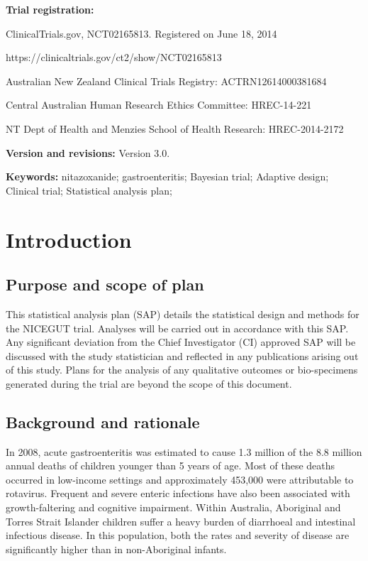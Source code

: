 \documentclass[a4paper]{article}
\begin{document}
\clearpage

{\bf Trial registration:} 

\setlength{\leftskip}{1cm}ClinicalTrials.gov, NCT02165813. Registered on June 18, 2014

\setlength{\leftskip}{1cm}https://clinicaltrials.gov/ct2/show/NCT02165813

\setlength{\leftskip}{1cm}Australian New Zealand Clinical Trials Registry: ACTRN12614000381684

\setlength{\leftskip}{1cm}Central Australian Human Research
Ethics Committee: HREC-14-221

\setlength{\leftskip}{1cm}NT Dept of Health and Menzies School of Health
Research: HREC-2014-2172

\setlength{\leftskip}{0pt}
{\bf Version and revisions:} Version 3.0.

{\bf Keywords:} nitazoxanide; gastroenteritis; Bayesian trial; Adaptive design; Clinical trial; Statistical analysis plan;


\clearpage

\tableofcontents

\clearpage


\section{Introduction}

\subsection{Purpose and scope of plan}

This statistical analysis plan (SAP) details the statistical design and methods for the NICEGUT trial. 
Analyses will be carried out in accordance with this SAP. 
Any significant deviation from the Chief Investigator (CI) approved SAP will be discussed with the study statistician and reflected in any publications arising out of this study.
Plans for the analysis of any qualitative outcomes or bio-specimens generated during the trial are beyond the scope of this document.

\subsection{Background and rationale}

In 2008, acute gastroenteritis was estimated to cause 1.3 million of the 8.8 million annual deaths of children younger than 5 years of age.
Most of these deaths occurred in low-income settings and approximately 453,000 were attributable to rotavirus.
Frequent and severe enteric infections have also been associated with growth-faltering and cognitive impairment.
Within Australia, Aboriginal and Torres Strait Islander children suffer a heavy burden of diarrhoeal and intestinal infectious disease.
In this population, both the rates and severity of disease are significantly higher than in non-Aboriginal infants.
\end{document}
